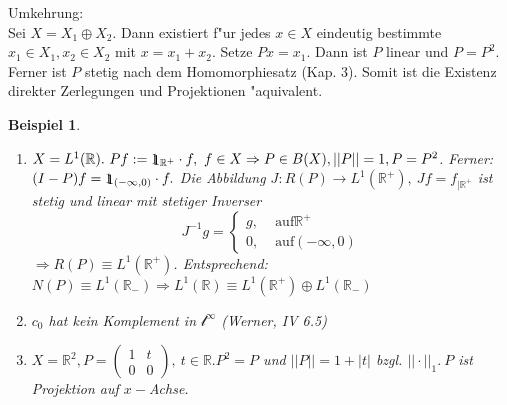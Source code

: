 \documentclass[a4paper,11pt]{book}
\newcommand{\R}{{\mathbb R}}
\newcommand{\sll}{{\mathcal l}}
\newcommand{\id}{1\hspace{-0,9ex}\raisebox{-0,2ex}{1}}
\newtheorem{Bsp}[Def]{Beispiel}
\theoremstyle{nonumberplain}
\begin{document}
Umkehrung:\\
Sei $X = X_1 \oplus X_2$. Dann existiert f"ur jedes $x \in X$ eindeutig bestimmte $x_1 \in X_1, x_2 \in X_2$ mit $x = x_1 + x_2$. Setze $Px = x_1$. Dann ist $P$ linear und $P=P^2$. Ferner ist $P$ stetig nach dem Homomorphiesatz (Kap. 3). Somit ist die Existenz direkter Zerlegungen und Projektionen "aquivalent.

\begin{Bsp}
\begin{enumerate}

\item[a)] $X = L^1(\R).\ Pf := \id_{\R^+} \cdot f,\ f \in X \Rightarrow P \in B(X), ||P|| = 1, P = P^2$. Ferner: $(I-P)f = \id_{(-\infty,0)} \cdot f.$ Die Abbildung $J: R(P) \rightarrow L^1(\R^+),\ Jf = f_{|\R^+}$ ist stetig und linear mit stetiger Inverser
\[
J^{-1}g = \left\{
\begin{array}{rl}
g ,& \text{ auf} \R^+ \\
0 ,& \text{ auf} (-\infty,0)
\end{array} \right.
\]
$\Rightarrow R(P) \equiv L^1(\R^+)$. Entsprechend: $N(P) \equiv L^1(\R_-) \Rightarrow L^1(\R) \equiv L^1(\R^+) \oplus L^1(\R_-)$

\item[b)] $c_0$ hat kein Komplement in $\sll^{\infty}$ (Werner, IV 6.5)

\item[c)] $X = \R^2, P = \begin{pmatrix} 1 & t \\ 0 & 0 \end{pmatrix},\ t \in \R. P^2 = P$ und $||P|| = 1 + |t|$ bzgl. $||\cdot||_1.\ P$ ist Projektion auf $x-$Achse.
\end{enumerate}
\end{Bsp}
\end{document}

